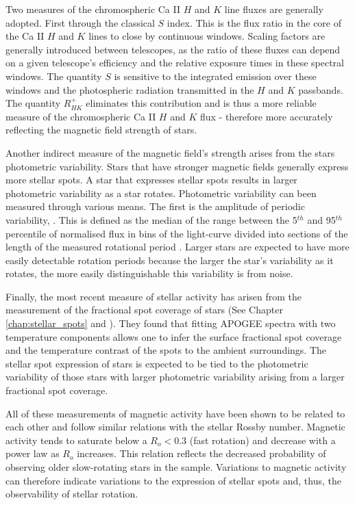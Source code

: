 Two measures of the chromospheric Ca II $H$ and $K$ line fluxes are generally adopted.
First through the classical $S$ index.
This is the flux ratio in the core of the Ca II $H$ and $K$ lines to close by continuous windows.
Scaling factors are generally introduced between telescopes, as the ratio of these fluxes can depend on a given telescope's efficiency and the relative exposure times in these spectral windows.
The quantity $S$ is sensitive to the integrated emission over these windows and the photospheric radiation transmitted in the $H$ and $K$ passbands.
The quantity $R_{HK}^{+}$ eliminates this contribution and is thus a more reliable measure of the chromospheric Ca II $H$ and $K$ flux - therefore more accurately reflecting the magnetic field strength of stars.

Another indirect measure of the magnetic field's strength arises from the stars photometric variability.
Stars that have stronger magnetic fields generally express more stellar spots.
A star that expresses stellar spots results in larger photometric variability as a star rotates.
Photometric variability can been measured through various means.
The first is the amplitude of periodic variability, \rper{}.
This is defined as the median of the range between the 5$^{th}$ and 95$^{th}$ percentile of normalised flux in bins of the light-curve divided into sections of the length of the measured rotational period \citep{mcquillan_rotation_2014}.
Larger \rper{} stars are expected to have more easily detectable rotation periods because the larger the star's variability as it rotates, the more easily distinguishable this variability is from noise.

Finally, the most recent measure of stellar activity has arisen from the measurement of the fractional spot coverage of stars (See Chapter \ref{chap:stellar_spots} and \citep{cao_starspots_2022}).
They found that fitting APOGEE spectra with two temperature components allows one to infer the surface fractional spot coverage and the temperature contrast of the spots to the ambient surroundings.
The stellar spot expression of stars is expected to be tied to the photometric variability of those stars with larger photometric variability arising from a larger fractional spot coverage.

All of these measurements of magnetic activity have been shown to be related to each other and follow similar relations with the stellar Rossby number.
Magnetic activity tends to saturate below a $R_o<0.3$ \citep{cao_starspots_2022} (fast rotation) and decrease with a power law as $R_o$ increases.
This relation reflects the decreased probability of observing older slow-rotating stars in the \citet{mcquillan_rotation_2014} sample.
Variations to magnetic activity can therefore indicate variations to the expression of stellar spots and, thus, the observability of stellar rotation.

